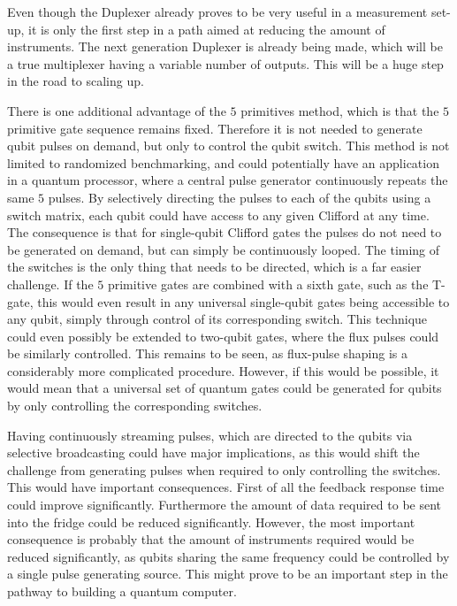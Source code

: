     Even though the Duplexer already proves to be very useful in a measurement set-up, it is only the first step in a path aimed at reducing the amount of instruments. The next generation Duplexer is already being made, which will be a true multiplexer having a variable number of outputs. This will be a huge step in the road to scaling up.

    There is one additional advantage of the $5$ primitives method, which is that the $5$ primitive gate sequence remains fixed. Therefore it is not needed to generate qubit pulses on demand, but only to control the qubit switch. This method is not limited to randomized benchmarking, and could potentially have an application in a quantum processor, where a central pulse generator continuously repeats the same $5$ pulses. By selectively directing the pulses to each of the qubits using a switch matrix, each qubit could have access to any given Clifford at any time. The consequence is that for single-qubit Clifford gates the pulses do not need to be generated on demand, but can simply be continuously looped. The timing of the switches is the only thing that needs to be directed, which is a far easier challenge. If the $5$ primitive gates are combined with a sixth gate, such as the T-gate, this would even result in any universal single-qubit gates being accessible to any qubit, simply through control of its corresponding switch.  This technique could even possibly be extended to two-qubit gates, where the flux pulses could be similarly controlled. This remains to be seen, as flux-pulse shaping is a considerably more complicated procedure. However, if this would be possible, it would mean that a universal set of quantum gates could be generated for qubits by only controlling the corresponding switches.

    Having continuously streaming pulses, which are directed to the qubits via selective broadcasting could have major implications, as this would shift the challenge from generating pulses when required to only controlling the switches. This would have important consequences. First of all the feedback response time could improve significantly. Furthermore the amount of data required to be sent into the fridge could be reduced significantly. However, the most important consequence is probably that the amount of instruments required would be reduced significantly, as qubits sharing the same frequency could be controlled by a single pulse generating source. This might prove to be an important step in the pathway to building a quantum computer.